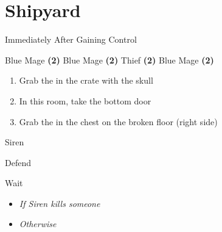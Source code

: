 \chapter{Shipyard}

\vspace{\baselineskip}

\begin{paracol}{2}

\begin{menu}{Immediately After Gaining Control}
	\varwb
    \begin{jobMenu}
        \lenna Blue Mage \textbf{(2\pointLeft)} \optimize
        \galuf Blue Mage \textbf{(2\pointLeft)} \equip{\broadsword}
        \faris Thief \textbf{(2\pointRight)}
        \bartz Blue Mage \textbf{(2\pointLeft)} \optimize
	\end{jobMenu}
    \varwe
\end{menu}

\begin{enumerate}
    \item Grab the  in the crate with the skull
    \item In this room, take the bottom door
    \item Grab the  in the chest on the broken floor (right side)
\end{enumerate}

\begin{boss}{Siren}
    \varwb
    \begin{round}{1}
        \faris Defend
        \everyone \leftCommand{\blue} \then \goblinPunch
    \end{round}
    \begin{round}{2}
        \item {}
        \faris Wait
        \begin{itemize}
            \item \textit{If Siren kills someone} \then \battleGroup{\textbf{\phoenixDown}}
            \item \textit{Otherwise} \then {}
        \end{itemize}
        \everyone \leftCommand{\blue} \then \goblinPunch
    \end{round}
    \varwe
\end{boss}

\end{paracol}
